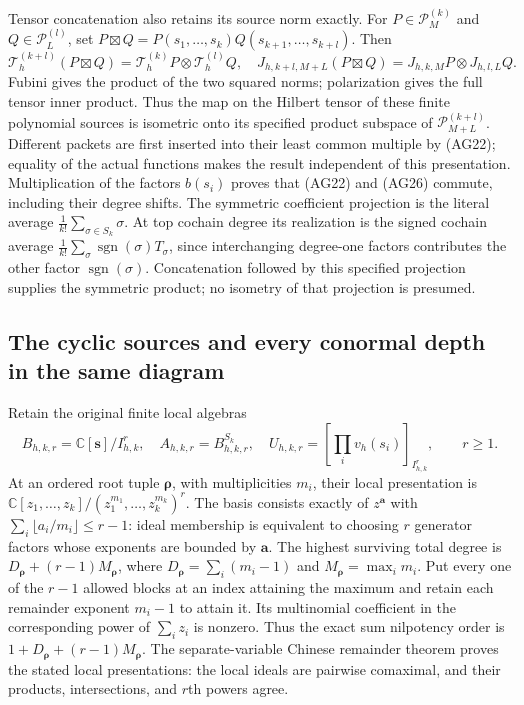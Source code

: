 Tensor concatenation also retains its source norm exactly.  For
$P\in\mathcal P_M^{(k)}$ and $Q\in\mathcal P_L^{(l)}$, set
$P\boxtimes Q=P(s_1,\ldots,s_k)Q(s_{k+1},\ldots,s_{k+l})$.
Then
\[
 \mathcal T_h^{(k+l)}(P\boxtimes Q)
       =\mathcal T_h^{(k)}P\otimes\mathcal T_h^{(l)}Q,
 \quad J_{h,k+l,M+L}(P\boxtimes Q)=J_{h,k,M}P\otimes J_{h,l,L}Q.
 \tag{AG26}
\]
Fubini gives the product of the two squared norms; polarization
gives the full tensor inner product.  Thus the map on the Hilbert
tensor of these finite polynomial sources is isometric onto its
specified product subspace of $\mathcal P_{M+L}^{(k+l)}$.
Different packets are first inserted into their least common
multiple by (AG22); equality of the actual functions makes the
result independent of this presentation.  Multiplication of the
factors $b(s_i)$ proves that (AG22) and (AG26) commute, including
their degree shifts.  The symmetric coefficient projection is the
literal average $\frac1{k!}\sum_{\sigma\in S_k}\sigma$.
At top cochain degree its realization is the signed cochain
average $\frac1{k!}\sum_\sigma\operatorname{sgn}(\sigma)T_\sigma$,
since interchanging degree-one factors contributes the other
factor $\operatorname{sgn}(\sigma)$.  Concatenation followed by
this specified projection supplies the symmetric product; no
isometry of that projection is presumed.

\subsection{The cyclic sources and every conormal depth in the same diagram}

Retain the original finite local algebras
\[
 B_{h,k,r}=\mathbb C[\mathbf s]/I_{h,k}^r,\quad
 A_{h,k,r}=B_{h,k,r}^{S_k},\quad
 U_{h,k,r}=[\prod_i v_h(s_i)]_{I_{h,k}^r},\qquad r\ge1.
 \tag{AG27}
\]
At an ordered root tuple $\boldsymbol\rho$, with multiplicities
$m_i$, their local presentation is
$\mathbb C[z_1,\ldots,z_k]/(z_1^{m_1},\ldots,z_k^{m_k})^r$.
The basis consists exactly of $z^{\mathbf a}$ with
$\sum_i\lfloor a_i/m_i\rfloor\le r-1$: ideal membership is
equivalent to choosing $r$ generator factors whose exponents are
bounded by $\mathbf a$.  The highest surviving total degree is
$D_{\boldsymbol\rho}+(r-1)M_{\boldsymbol\rho}$, where
$D_{\boldsymbol\rho}=\sum_i(m_i-1)$ and
$M_{\boldsymbol\rho}=\max_i m_i$.  Put every one of the $r-1$
allowed blocks at an index attaining the maximum and retain each
remainder exponent $m_i-1$ to attain it.  Its multinomial coefficient
in the corresponding power of $\sum_i z_i$ is nonzero.  Thus
the exact sum nilpotency order is
$1+D_{\boldsymbol\rho}+(r-1)M_{\boldsymbol\rho}$.
The separate-variable Chinese remainder theorem proves the stated
local presentations: the local ideals are pairwise comaximal,
and their products, intersections, and $r$th powers agree.

